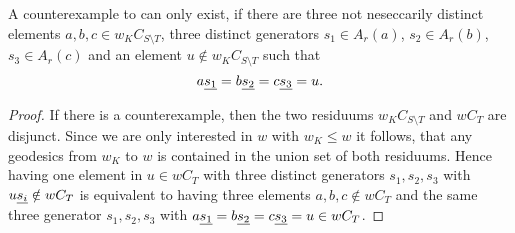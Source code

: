 \begin{lemm}
\label{counterexample-simplification2}
A counterexample to  can only exist, if there are three not
neseccarily distinct elements $a,b,c \in w_K C_{S \setminus T}$, three
distinct generators $s_1 \in A_r(a)$, $s_2 \in A_r(b)$, $s_3 \in A_r(c)$ and an
element $u \notin w_K C_{S \setminus T}$ such that
$$ a \underline{s_1} = b \underline{s_2} = c \underline{s_3} = u. $$

\begin{proof}
If there is a counterexample, then the two residuums $w_K C_{S \setminus T}$ and
$w C_T$ are disjunct. Since we are only interested in $w$ with $w_K \leq w$
it follows, that any geodesics from $w_K$ to $w$ is contained in the union set
of both residuums. Hence having one element in $u \in w C_T$ with three distinct
generators $s_1,s_2,s_3$ with $u \underline{s_i} \notin w C_T$ is equivalent to having
three elements $a,b,c \notin w C_T$ and the same three generator $s_1,s_2,s_3$
with $a \underline{s_1} = b \underline{s_2} = c \underline{s_3} = u \in w C_T$.
\end{proof}
\end{lemm}